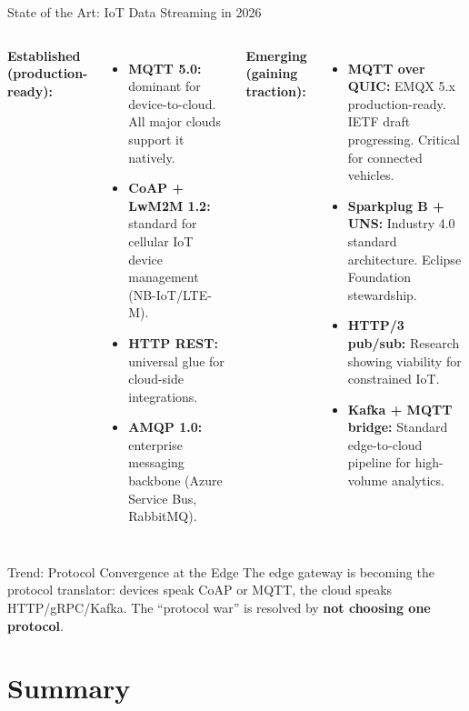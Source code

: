 \documentclass[aspectratio=169,11pt]{beamer}
\begin{document}
\begin{frame}{State of the Art: IoT Data Streaming in 2026}
    \begin{columns}
        \textbf{Established (production-ready):}
        \begin{itemize}
            \item \textbf{MQTT 5.0:} dominant for device-to-cloud. All major clouds support it natively.
            \item \textbf{CoAP + LwM2M 1.2:} standard for cellular IoT device management (NB-IoT/LTE-M).
            \item \textbf{HTTP REST:} universal glue for cloud-side integrations.
            \item \textbf{AMQP 1.0:} enterprise messaging backbone (Azure Service Bus, RabbitMQ).
        \end{itemize}
        
        \textbf{Emerging (gaining traction):}
        \begin{itemize}
            \item \textbf{MQTT over QUIC:} EMQX 5.x production-ready. IETF draft progressing. Critical for connected vehicles.
            \item \textbf{Sparkplug B + UNS:} Industry 4.0 standard architecture. Eclipse Foundation stewardship.
            \item \textbf{HTTP/3 pub/sub:} Research showing viability for constrained IoT.
            \item \textbf{Kafka + MQTT bridge:} Standard edge-to-cloud pipeline for high-volume analytics.
        \end{itemize}
    \end{columns}
    
    \vspace{0.1cm}
    \begin{alertblock}{Trend: Protocol Convergence at the Edge}
        The edge gateway is becoming the protocol translator: devices speak CoAP or MQTT, the cloud speaks HTTP/gRPC/Kafka. The ``protocol war'' is resolved by \textbf{not choosing one protocol}.
    \end{alertblock}
\end{frame}

\section{Summary}
\end{document}
